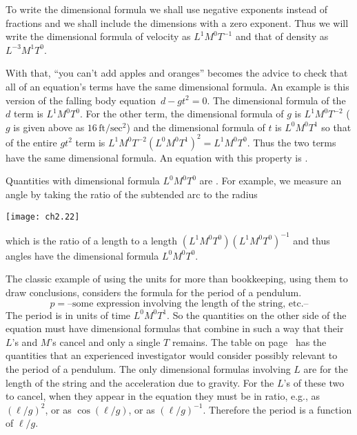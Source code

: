 To write the dimensional formula 
we shall use negative exponents instead of  
fractions and we shall include the dimensions with a
zero exponent.
Thus we will write the dimensional formula of
velocity as $L^1M^0T^{-1}$ and that of density
as $L^{-3}M^1T^0$.

With that, ``you can't add apples and oranges'' becomes
the advice to check that all of an equation's terms have 
the same dimensional formula.
An example is this version of the falling body equation~$d-gt^2=0$. 
The dimensional formula of the $d$ term is $L^1M^0T^0$. 
For the other term, the dimensional formula of $g$ is $L^1M^0T^{-2}$ 
($g$ is given above as $16\,\text{ft}/\text{sec}^2$) 
and the dimensional formula of $t$ is $L^0M^0T^1$ so that of  
the entire $gt^2$ term is
$L^1M^0T^{-2}(L^0M^0T^1)^2=L^1M^0T^0$. 
Thus the two terms have the same dimensional formula.
An equation with this property is .

Quantities with dimensional formula $L^0M^0T^0$ are .
For example, we measure an angle by taking
the ratio of the subtended arc to the radius
\begin{center}
  \texttt{[image: ch2.22]}
\end{center}
which is the ratio of a length to a length $(L^1M^0T^0)(L^1M^0T^0)^{-1}$ and
thus angles have the dimensional formula $L^0M^0T^0$.

The classic example of using the units for more than bookkeeping, using them 
to draw conclusions, considers the formula for the period of a pendulum.
\begin{equation*}
  p=\text{--some expression involving the length of the string, etc.--}
\end{equation*}
The period is in units of time $L^0M^0T^1$.
So the quantities on the 
other side of the equation must have dimensional formulas that combine 
in such a way that their $L$'s and $M$'s cancel and only a 
single $T$ remains.
The table on page~\pageref{table:Dimen} has the quantities that
an experienced investigator would consider possibly relevant to the period of
a pendulum. 
The only dimensional formulas involving $L$ are for
the length of the string and the acceleration due to gravity.
For the $L$'s of these two to cancel, when they appear 
in the equation they must be in ratio,
e.g., as $(\ell/g)^2$, or as $\cos(\ell/g)$, 
or as $(\ell/g)^{-1}$.
Therefore the period is a function of $\ell/g$. 

